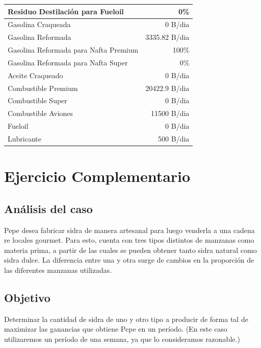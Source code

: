 \documentclass[a4paper,10pt]{article}
\begin{document}
\begin{center}
\begin{tabular}{ l  r }
	Residuo Destilaci\'on para Fueloil	& 	0\%	\\ \hline
	Gasolina Craqueada			&	0 B/dia	\\ \hline
	Gasolina Reformada			&	3335.82 B/dia	\\ \hline
	Gasolina Reformada para Nafta Premium  &	100\%	\\
	Gasolina Reformada para Nafta Super	&	0\%	\\ \hline
	Aceite Craqueado 			&	0 B/dia \\ \hline
	Combustible Premium			&	20422.9 B/dia\\                
	Combustible Super			& 	0 B/dia\\ 
	Combustible Aviones 			&	11500 B/dia \\                
	Fueloil 				 &      0 B/dia \\ 
	Lubricante				 &      500 B/dia	\\        
	
 \end{tabular}

\end{center}

\newpage

\section{Ejercicio Complementario}

\subsection{An\'alisis del caso}

Pepe desea fabricar sidra de manera artesanal para luego venderla a una cadena re locales gourmet. Para esto, cuenta con tres tipos distintos de manzanas como materia prima, a partir de las cuales se pueden obtener tanto sidra natural como sidra dulce. La diferencia entre una y otra surge de cambios en la proporci\'on de las diferentes manzanas utilizadas. 

\subsection{Objetivo}

Determinar la cantidad de sidra de uno y otro tipo a producir de forma tal de maximizar las ganancias que obtiene Pepe en un per\'iodo. (En este caso utilizaremos un per\'iodo de una semana, ya que lo consideramos razonable.)
\end{document}
